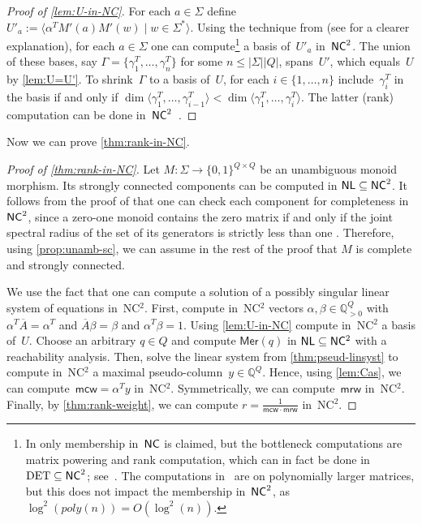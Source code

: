 \documentclass[11pt,a4paper]{amsart}
\newcommand{\NCT}{\textnormal{\textsf{NC$^2$}}\xspace}
\newcommand{\NC}{\textnormal{\textsf{NC}}\xspace}
\newcommand{\NL}
{\textnormal{\textsf{NL}}\xspace}
\newcommand{\spn}[1]{\mathord{\langle #1 \rangle}}
\newcommand{\Mer}{\mathsf{Mer}}
\newcommand{\mcw}{\mathsf{mcw}}
\newcommand{\mrw}{\mathsf{mrw}}
\theoremstyle{plain}
\theoremstyle{definition}
\theoremstyle{defC}
\theoremstyle{thmC}
\theoremstyle{plain}
\numberwithin{equation}{section}
\begin{document}
\begin{proof}[Proof of \autoref{lem:U-in-NC}]
For each $a \in \Sigma$ define $U'_a := \spn{\alpha^T M'(a) M'(w) \mid w \in \Sigma^*}$.
Using the technique from \cite[Section 4.2]{KieferMW14} (see \cite[Proposition 5.2]{KieferWeighted20} for a clearer explanation), for each $a \in \Sigma$ one can compute\footnote{In \cite{KieferMW14,KieferWeighted20} only membership in~$\NC$ is claimed, but the bottleneck computations are matrix powering and rank computation, which can in fact be done in $\mathrm{DET} \subseteq \NC^2$; see~\cite{Cook85}.
The computations in~\cite[Proposition 5.2]{KieferWeighted20} are on polynomially larger matrices, but this does not impact the membership in~$\NC^2$, as $\log^2(\mathit{poly}(n)) = O(\log^2(n))$.} a basis of~$U'_a$ in~$\NC^2$.
The union of these bases, say $\Gamma = \{\gamma_1^T, \ldots, \gamma_n^T\}$ for some $n \le |\Sigma| |Q|$, spans~$U'$, which equals~$U$ by \autoref{lem:U=U'}.
To shrink~$\Gamma$ to a basis of~$U$, for each $i \in \{1, \ldots, n\}$ include~$\gamma_i^T$ in the basis if and only if $\dim \spn{\gamma_1^T, \ldots, \gamma_{i-1}^T} < \dim \spn{\gamma_1^T, \ldots, \gamma_i^T}$.
The latter (rank) computation can be done in~$\NC^2$~\cite{IbarraMoranRosier80}. %
\end{proof}

\noindent
Now we can prove \autoref{thm:rank-in-NC}.
\begin{proof}[Proof of \autoref{thm:rank-in-NC}]
Let $M : \Sigma \to \{0,1\}^{Q \times Q}$ be an unambiguous monoid morphism.
Its strongly connected components can be computed in $\NL \subseteq \NC^2$.
It follows from the proof of \cite[Proposition 3]{Kiefer2021} that one can check each component for completeness in~$\NC^2$, since a zero-one monoid contains the zero matrix if and only if the joint spectral radius of the set of its generators is strictly less than one \cite{Kiefer2021}.
Therefore, using \autoref{prop:unamb-sc}, we can assume in the rest of the proof that $M$ is complete and strongly connected.

We use the fact that one can compute a solution of a possibly singular linear system of equations in~\NCT \cite[Section~5]{BorodinGH82}.
First, compute in~\NCT vectors $\alpha, \beta \in \mathbb{Q}_{>0}^Q$ with $\alpha^T \overline{A} = \alpha^T$ and $\overline{A} \beta = \beta$ and $\alpha^T \beta = 1$.
Using \autoref{lem:U-in-NC} compute in~\NCT a basis of~$U$.
Choose an arbitrary $q \in Q$ and compute $\Mer(q)$ in $\NL \subseteq \NCT$ with a reachability analysis.
Then, solve the linear system from \autoref{thm:pseud-linsyst} to compute in~\NCT a maximal pseudo-column~$y \in \mathbb{Q}^Q$.
Hence, using \autoref{lem:Cas}, we can compute~$\mcw = \alpha^T y$ in~\NCT.
Symmetrically, we can compute~$\mrw$ in~\NCT.
Finally, by \autoref{thm:rank-weight}, we can compute $r = \frac{1}{\mcw \cdot \mrw}$ in~\NCT.
\end{proof}
\end{document}
